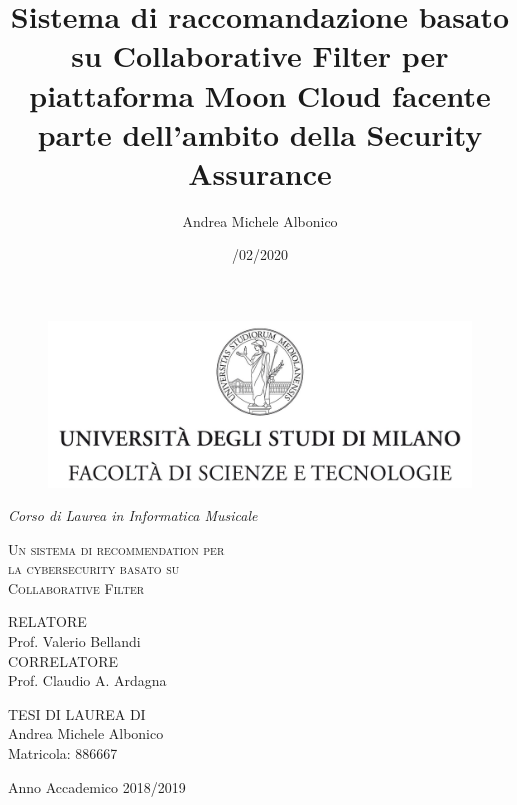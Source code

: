 \documentclass[12pt, fleqn, twoside, a4paper]{book}
\title{Sistema di raccomandazione basato su Collaborative Filter per piattaforma Moon Cloud 
facente parte dell'ambito della Security Assurance}
\author{Andrea Michele Albonico}
\date{/02/2020}
\begin{document}
\frontmatter

\begin{titlepage}
    \begin{center}
        \begin{figure}
            \centering
            \includegraphics[height=5.0 cm]{logo}
        \end{figure}
        \vspace{.2 cm}
        {\Large
            \emph{Corso di Laurea in Informatica Musicale}
        }
        \vfill
        \begin{LARGE}
            \textsc{Un sistema di recommendation per\\[-0.2 cm]
            la cybersecurity basato su\\[.2 cm]
            Collaborative Filter}
        \end{LARGE}
        \vfill
        \begin{flushleft}
            {\large
                RELATORE\\[.3 cm] Prof. Valerio Bellandi\\[1 cm]
                \noindent CORRELATORE\\[.3 cm] Prof. Claudio A. Ardagna
            }
        \end{flushleft}
        \vfill
        \begin{flushright}
            {\large TESI DI LAUREA DI\\[.3cm] Andrea Michele Albonico\\[.15cm] Matricola: 886667}
        \end{flushright}
        \vfill
        {\Large Anno Accademico 2018/2019}
    \end{center}
\end{titlepage}

\break




\end{document}
